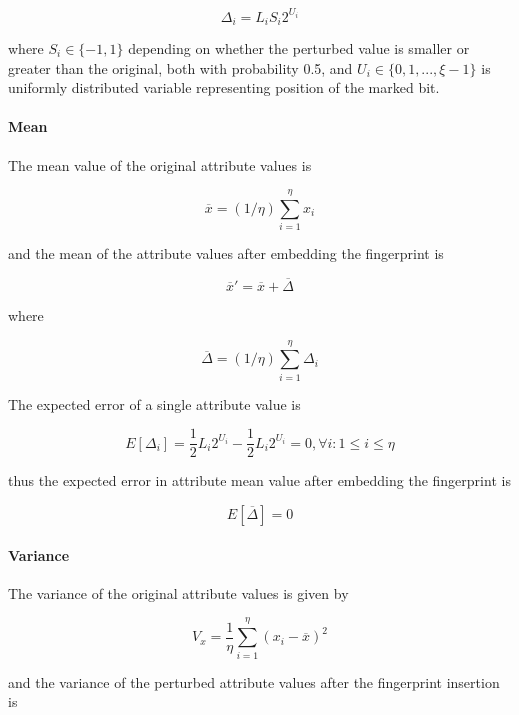 \begin{equation}
\Delta_i = L_i S_i 2^{U_i}
\end{equation}

where $S_i \in \{-1,1\}$ depending on whether the perturbed value is smaller or greater than the original, both with probability 0.5, and $U_i \in \{0,1,...,\xi-1\}$ is uniformly distributed variable representing position of the marked bit. 
\paragraph{Mean}
The mean value of the original attribute values is

\begin{equation}
\overline{x}=(1/\eta)\sum_{i=1}^{\eta}x_i
\end{equation}

and the mean of the attribute values after embedding the fingerprint is

\begin{equation}
\overline{x}'=\overline{x}+\overline{\Delta}
\end{equation} 

where

\begin{equation}
\overline{\Delta}=(1/\eta)\sum_{i=1}^{\eta} \Delta_i
\end{equation}

The expected error of a single attribute value is

\begin{equation}
E[\Delta_i]=\frac{1}{2} L_i 2^{U_i} - \frac{1}{2} L_i 2^{U_i} = 0, \forall i:1 \leq i \leq \eta
\end{equation}

thus the expected error in attribute mean value after embedding the fingerprint is 

\begin{equation}
E[\overline{\Delta}]=0
\end{equation}

\paragraph{Variance}
The variance of the original attribute values is given by 

\begin{equation}
V_x=\frac{1}{\eta}\sum_{i=1}^{\eta} (x_i - \overline{x})^2
\end{equation}

and the variance of the perturbed attribute values after the fingerprint insertion is 

